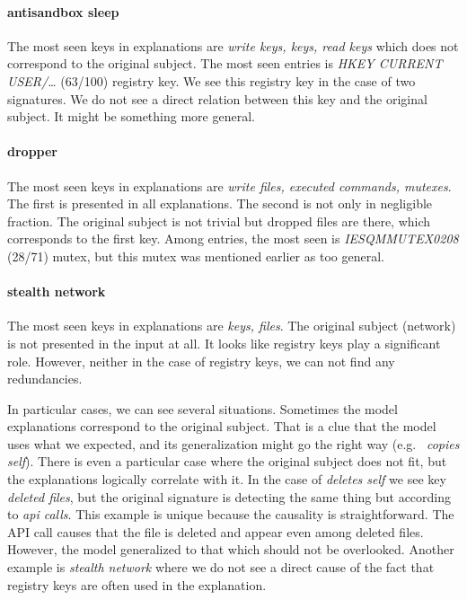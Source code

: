 \paragraph{antisandbox sleep}
The most seen keys in explanations are \emph{write keys, keys, read keys} which does not correspond to the original subject. The most seen entries is \emph{HKEY CURRENT USER/\dots} (63/100) registry key. We see this registry key in the case of two signatures. We do not see a direct relation between this key and the original subject. It might be something more general.

\paragraph{dropper}
The most seen keys in explanations are \emph{write files, executed commands, mutexes}. The first is presented in all explanations. The second is not only in negligible fraction. The original subject is not trivial but dropped files are there, which corresponds to the first key. Among entries, the most seen is \emph{IESQMMUTEX0208} (28/71) mutex, but this mutex was mentioned earlier as too general.

\paragraph{stealth network}
The most seen keys in explanations are \emph{keys, files}. The original subject (network) is not presented in the input at all. It looks like registry keys play a significant role. However, neither in the case of registry keys, we can not find any redundancies.

\hfill \break

In particular cases, we can see several situations. Sometimes the model explanations correspond to the original subject. That is a clue that the model uses what we expected, and its generalization might go the right way (e.g. \ \emph{copies self}). There is even a particular case where the original subject does not fit, but the explanations logically correlate with it. In the case of \emph{deletes self} we see key \emph{deleted files}, but the original signature is detecting the same thing but according to \emph{api calls}. This example is unique because the causality is straightforward. The API call causes that the file is deleted and appear even among deleted files. However, the model generalized to that which should not be overlooked. Another example is \emph{stealth network} where we do not see a direct cause of the fact that registry keys are often used in the explanation.

